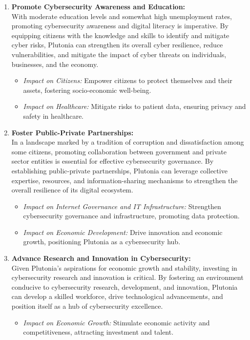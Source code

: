 \documentclass[
	a4paper, %
	10pt, %
]{CSSullivanBusinessReport}
\begin{document}
\begin{fullwidth}
\begin{justify}
\begin{enumerate}
\begin{itemize}
		\end{itemize}
	\item \textbf{Promote Cybersecurity Awareness and Education:} \\With moderate education levels and somewhat high unemployment rates, promoting cybersecurity awareness and digital literacy is imperative. By equipping citizens with the knowledge and skills to identify and mitigate cyber risks, Plutonia can strengthen its overall cyber resilience, reduce vulnerabilities, and mitigate the impact of cyber threats on individuals, businesses, and the economy.
		\begin{itemize}
			\item \textit{Impact on Citizens:} Empower citizens to protect themselves and their assets, fostering socio-economic well-being.
			\item \textit{Impact on Healthcare:} Mitigate risks to patient data, ensuring privacy and safety in healthcare.
		\end{itemize}
	\item \textbf{Foster Public-Private Partnerships:} \\In a landscape marked by a tradition of corruption and dissatisfaction among some citizens, promoting collaboration between government and private sector entities is essential for effective cybersecurity governance. By establishing public-private partnerships, Plutonia can leverage collective expertise, resources, and information-sharing mechanisms to strengthen the overall resilience of its digital ecosystem.
		\begin{itemize}
			\item \textit{Impact on Internet Governance and IT Infrastructure:} Strengthen cybersecurity governance and infrastructure, promoting data protection.
			\item \textit{Impact on Economic Development:} Drive innovation and economic growth, positioning Plutonia as a cybersecurity hub.
		\end{itemize}
	\item \textbf{Advance Research and Innovation in Cybersecurity:} \\Given Plutonia's aspirations for economic growth and stability, investing in cybersecurity research and innovation is critical. By fostering an environment conducive to cybersecurity research, development, and innovation, Plutonia can develop a skilled workforce, drive technological advancements, and position itself as a hub of cybersecurity excellence.
		\begin{itemize}
			\item \textit{Impact on Economic Growth:} Stimulate economic activity and competitiveness, attracting investment and talent.
		\end{itemize}
\end{enumerate}


\end{justify}
\end{fullwidth}
\end{document}
